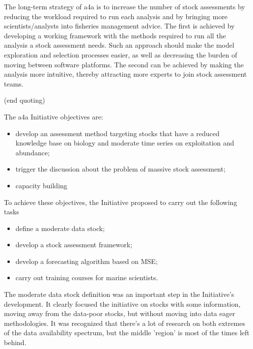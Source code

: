 \documentclass[a4paper,english,10pt]{article}\usepackage[]{graphicx}\usepackage[]{color}
\begin{document}
The long-term strategy of a4a is to increase the number of stock assessments by reducing the workload required to run each analysis and by bringing more scientists/analysts into fisheries management advice. The first is achieved by developing a working framework with the methods required to run all the analysis a stock assessment needs. Such an approach should make the model exploration and selection processes easier, as well as decreasing the burden of moving between software platforms. The second can be achieved by making the analysis more intuitive, thereby attracting more experts to join stock assessment teams.

(end quoting)

The a4a Initiative objectives are:
\begin{itemize}
	\item develop an assessment method targeting stocks that have a reduced knowledge base on biology and moderate time series on exploitation and abundance;
	\item trigger the discussion about the problem of massive stock assessment;
	\item capacity building
\end{itemize}

To achieve these objectives, the Initiative proposed to carry out the following tasks
\begin{itemize}
	\item define a moderate data stock;
	\item develop a stock assessment framework;
	\item develop a forecasting algorithm based on MSE;
	\item carry out training courses for marine scientists.
\end{itemize}

The moderate data stock definition was an important step in the Initiative's development. It clearly focused the initiative on stocks with some information, moving away from the data-poor stocks, but without moving into data eager methodologies. It was recognized that there's a lot of research on both extremes of the data availability spectrum, but the middle 'region' is most of the times left behind.
\end{document}
